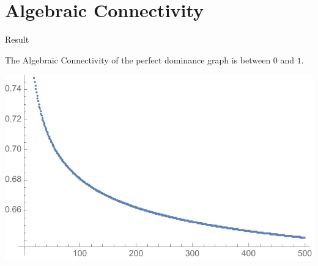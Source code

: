 \documentclass{beamer}
\begin{document}
\section{Algebraic Connectivity}

\begin{frame}{Result}
\begin{minipage}{0.45\textwidth}
The Algebraic Connectivity of the perfect dominance graph is between $0$ and $1$.
\end{minipage}\hfill
\begin{minipage}{0.45\textwidth}
\centering
\includegraphics[scale=0.45]{../../Mathematica/alg-con-dom.pdf}
\end{minipage}
\end{frame}
\end{document}
